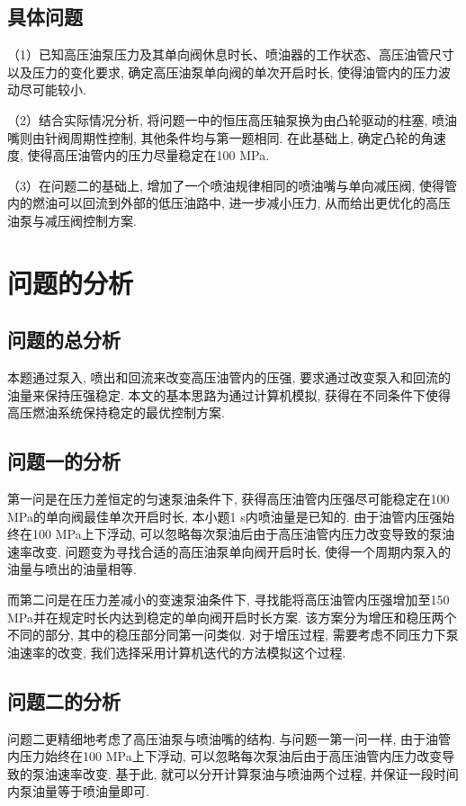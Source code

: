 \documentclass{cumcmthesis}
\begin{document}
\subsection{具体问题}

（1）已知高压油泵压力及其单向阀休息时长、喷油器的工作状态、高压油管尺寸以及压力的变化要求, 确定高压油泵单向阀的单次开启时长, 使得油管内的压力波动尽可能较小. 

（2）结合实际情况分析, 将问题一中的恒压高压轴泵换为由凸轮驱动的柱塞, 喷油嘴则由针阀周期性控制, 其他条件均与第一题相同. 在此基础上, 确定凸轮的角速度, 使得高压油管内的压力尽量稳定在100 MPa. 

（3）在问题二的基础上, 增加了一个喷油规律相同的喷油嘴与单向减压阀, 使得管内的燃油可以回流到外部的低压油路中, 进一步减小压力, 从而给出更优化的高压油泵与减压阀控制方案. 

\section{问题的分析}
\subsection{问题的总分析}
本题通过泵入, 喷出和回流来改变高压油管内的压强, 要求通过改变泵入和回流的油量来保持压强稳定. 
本文的基本思路为通过计算机模拟, 获得在不同条件下使得高压燃油系统保持稳定的最优控制方案. 

\subsection{问题一的分析}
第一问是在压力差恒定的匀速泵油条件下, 获得高压油管内压强尽可能稳定在100 MPa的单向阀最佳单次开启时长, 本小题1 s内喷油量是已知的. 由于油管内压强始终在100 MPa上下浮动, 可以忽略每次泵油后由于高压油管内压力改变导致的泵油速率改变. 问题变为寻找合适的高压油泵单向阀开启时长, 使得一个周期内泵入的油量与喷出的油量相等. 

而第二问是在压力差减小的变速泵油条件下, 寻找能将高压油管内压强增加至150 MPa并在规定时长内达到稳定的单向阀开启时长方案. 该方案分为增压和稳压两个不同的部分, 其中的稳压部分同第一问类似. 对于增压过程, 需要考虑不同压力下泵油速率的改变, 我们选择采用计算机迭代的方法模拟这个过程. 
\subsection{问题二的分析}
问题二更精细地考虑了高压油泵与喷油嘴的结构. 与问题一第一问一样, 由于油管内压力始终在100 MPa上下浮动, 可以忽略每次泵油后由于高压油管内压力改变导致的泵油速率改变. 基于此, 就可以分开计算泵油与喷油两个过程, 并保证一段时间内泵油量等于喷油量即可. 
\end{document}
